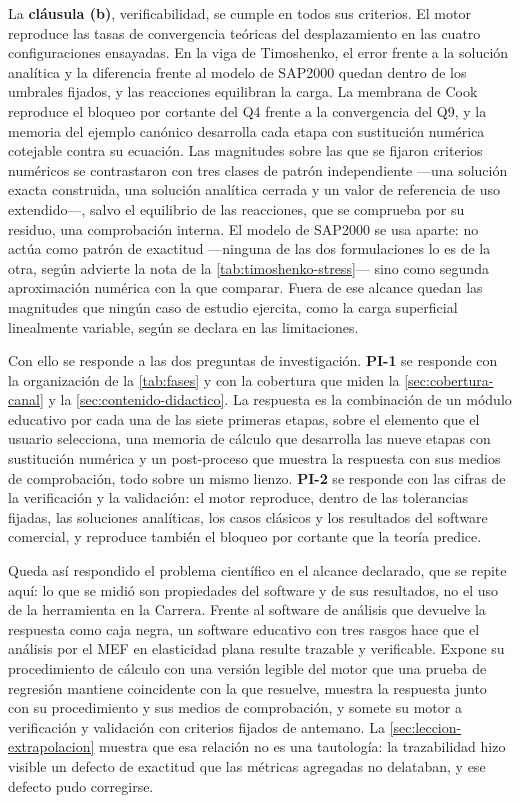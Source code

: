 La \textbf{cláusula (b)}, verificabilidad, se cumple en todos sus criterios. El motor reproduce las tasas de convergencia teóricas del desplazamiento en las cuatro configuraciones ensayadas. En la viga de Timoshenko, el error frente a la solución analítica y la diferencia frente al modelo de SAP2000 quedan dentro de los umbrales fijados, y las reacciones equilibran la carga. La membrana de Cook reproduce el bloqueo por cortante del Q4 frente a la convergencia del Q9, y la memoria del ejemplo canónico desarrolla cada etapa con sustitución numérica cotejable contra su ecuación. Las magnitudes sobre las que se fijaron criterios numéricos se contrastaron con tres clases de patrón independiente ---una solución exacta construida, una solución analítica cerrada y un valor de referencia de uso extendido---, salvo el equilibrio de las reacciones, que se comprueba por su residuo, una comprobación interna. El modelo de SAP2000 se usa aparte: no actúa como patrón de exactitud ---ninguna de las dos formulaciones lo es de la otra, según advierte la nota de la \autoref{tab:timoshenko-stress}--- sino como segunda aproximación numérica con la que comparar. Fuera de ese alcance quedan las magnitudes que ningún caso de estudio ejercita, como la carga superficial linealmente variable, según se declara en las limitaciones.

Con ello se responde a las dos preguntas de investigación. \textbf{PI-1} se responde con la organización de la \autoref{tab:fases} y con la cobertura que miden la \autoref{sec:cobertura-canal} y la \autoref{sec:contenido-didactico}. La respuesta es la combinación de un módulo educativo por cada una de las siete primeras etapas, sobre el elemento que el usuario selecciona, una memoria de cálculo que desarrolla las nueve etapas con sustitución numérica y un post-proceso que muestra la respuesta con sus medios de comprobación, todo sobre un mismo lienzo. \textbf{PI-2} se responde con las cifras de la verificación y la validación: el motor reproduce, dentro de las tolerancias fijadas, las soluciones analíticas, los casos clásicos y los resultados del software comercial, y reproduce también el bloqueo por cortante que la teoría predice.

Queda así respondido el problema científico en el alcance declarado, que se repite aquí: lo que se midió son propiedades del software y de sus resultados, no el uso de la herramienta en la Carrera. Frente al software de análisis que devuelve la respuesta como caja negra, un software educativo con tres rasgos hace que el análisis por el MEF en elasticidad plana resulte trazable y verificable. Expone su procedimiento de cálculo con una versión legible del motor que una prueba de regresión mantiene coincidente con la que resuelve, muestra la respuesta junto con su procedimiento y sus medios de comprobación, y somete su motor a verificación y validación con criterios fijados de antemano. La \autoref{sec:leccion-extrapolacion} muestra que esa relación no es una tautología: la trazabilidad hizo visible un defecto de exactitud que las métricas agregadas no delataban, y ese defecto pudo corregirse.
